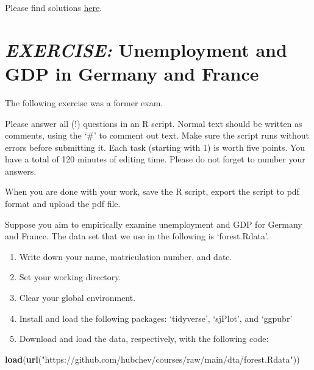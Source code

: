 \documentclass[
  12pt,
  oneside]{book}
\newenvironment{Shaded}{\begin{snugshade}}{\end{snugshade}}
\newcommand{\FunctionTok}[1]{\textcolor[rgb]{0.13,0.29,0.53}{\textbf{#1}}}
\newcommand{\NormalTok}[1]{#1}
\newcommand{\StringTok}[1]{\textcolor[rgb]{0.31,0.60,0.02}{#1}}
\begin{document}
Please find solutions \href{https://raw.githubusercontent.com/hubchev/courses/main/scr/convergence.R}{here}.

\hypertarget{exercise-unemployment-and-gdp-in-germany-and-france}{%
\section*{\texorpdfstring{\emph{EXERCISE:} Unemployment and GDP in Germany and France}{EXERCISE: Unemployment and GDP in Germany and France}}\label{exercise-unemployment-and-gdp-in-germany-and-france}}

The following exercise was a former exam.

Please answer all (!) questions in an R script. Normal text should be written as comments, using the `\#' to comment out text. Make sure the script runs without errors before submitting it. Each task (starting with 1) is worth five points. You have a total of 120 minutes of editing time. Please do not forget to number your answers.

When you are done with your work, save the R script, export the script to pdf format and upload the pdf file.

Suppose you aim to empirically examine unemployment and GDP for Germany and France. The data set that we use in the following is `forest.Rdata'.

\begin{enumerate}
\def\labelenumi{(\arabic{enumi})}
\setcounter{enumi}{-1}
\item
  Write down your name, matriculation number, and date.
\item
  Set your working directory.
\item
  Clear your global environment.
\item
  Install and load the following packages: `tidyverse', `sjPlot', and `ggpubr'
\item
  Download and load the data, respectively, with the following code:
\end{enumerate}

\begin{Shaded}
\begin{Highlighting}[]
\FunctionTok{load}\NormalTok{(}\FunctionTok{url}\NormalTok{(}\StringTok{"https://github.com/hubchev/courses/raw/main/dta/forest.Rdata"}\NormalTok{))}
\end{Highlighting}
\end{Shaded}
\end{document}
